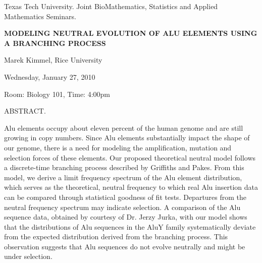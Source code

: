 \documentclass[oneside]{amsart}
\newcommand{\talktitle}{
Modeling neutral evolution of Alu elements using a branching process}
\newcommand{\talkspeaker}{Marek Kimmel, Rice University}
\newcommand{\talkdate}{Wednesday, January 27, 2010}
\newcommand{\talkabstract}{
Alu elements occupy about eleven percent of the human genome
and are still growing in copy numbers. Since Alu elements substantially
impact the shape of our genome, there is a need for modeling the
amplification, mutation and selection forces of these elements.
Our proposed theoretical neutral model follows a discrete-time branching
process described by Griffiths and Pakes. From this model, we derive a
limit frequency spectrum of the Alu element distribution, which serves as
the theoretical, neutral frequency to which real Alu insertion data can be
compared through statistical goodness of fit tests. Departures from the
neutral frequency spectrum may indicate selection. A comparison
of the Alu sequence data, obtained by courtesy of Dr. Jerzy Jurka, with
our model shows that the distributions of Alu sequences in the AluY family
systematically deviate from the expected distribution derived from the
branching process. This observation suggests that Alu
sequences do not evolve neutrally and might be under selection.
}
\begin{document}
\thispagestyle{empty}

\begin{center}
Texas Tech University. Joint BioMathematics, Statistics and Applied Mathematics Seminars.

\end{center}

\begin{center}

\textbf{\LARGE {\uppercase{\talktitle}} }

\talkspeaker

\talkdate

Room: Biology 101, Time: 4:00pm

\end{center}

ABSTRACT.
\talkabstract
\end{document}
